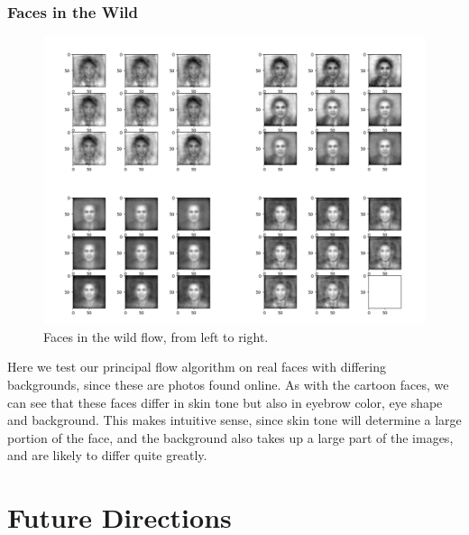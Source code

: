 \documentclass[12pt]{report}
\begin{document}
\subsection{Faces in the Wild}
\begin{figure}[h]
    \begin{center}
        \includegraphics[scale=0.2]{main_lfw_10_05.png}
        \caption{Faces in the wild flow, from left to right.}
        \label{fig:cartoonfaceflows}
    \end{center}
\end{figure}

Here we test our principal flow algorithm on real faces with differing backgrounds, 
since these are photos found online. As with the cartoon faces, we can see that
these faces differ in skin tone but also in eyebrow color, eye shape and background. 
This makes intuitive sense, since skin tone will determine a large portion of the face,
and the background also takes up a large part of the images, and are likely to differ 
quite greatly.


\chapter*{Future Directions}
\end{document}
